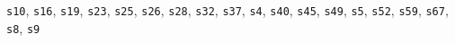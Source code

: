 \texttt{s10}, \texttt{s16}, \texttt{s19}, \texttt{s23}, \texttt{s25}, \texttt{s26}, \texttt{s28}, \texttt{s32}, \texttt{s37}, \texttt{s4}, \texttt{s40}, \texttt{s45}, \texttt{s49}, \texttt{s5}, \texttt{s52}, \texttt{s59}, \texttt{s67}, \texttt{s8}, \texttt{s9}
